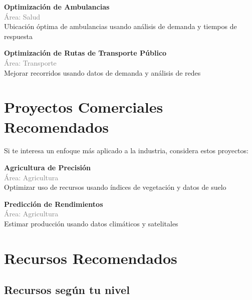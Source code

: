 \documentclass[11pt,a4paper]{article}
\begin{document}
\begin{tcolorbox}[colback=green!5,colframe=darkgreen,title={\small Proyecto Científico \#3}]
\textbf{Optimización de Ambulancias}\\[0.2cm]
\textcolor{gray}{\small Área: Salud}\\[0.2cm]
Ubicación óptima de ambulancias usando análisis de demanda y tiempos de respuesta
\end{tcolorbox}


\begin{tcolorbox}[colback=green!5,colframe=darkgreen,title={\small Proyecto Científico \#4}]
\textbf{Optimización de Rutas de Transporte Público}\\[0.2cm]
\textcolor{gray}{\small Área: Transporte}\\[0.2cm]
Mejorar recorridos usando datos de demanda y análisis de redes
\end{tcolorbox}


\section*{ Proyectos Comerciales Recomendados}

Si te interesa un enfoque más aplicado a la industria, considera estos proyectos:


\begin{tcolorbox}[colback=orange!5,colframe=darkorange,title={\small Proyecto Comercial \#1}]
\textbf{Agricultura de Precisión}\\[0.2cm]
\textcolor{gray}{\small Área: Agricultura}\\[0.2cm]
Optimizar uso de recursos usando índices de vegetación y datos de suelo
\end{tcolorbox}


\begin{tcolorbox}[colback=orange!5,colframe=darkorange,title={\small Proyecto Comercial \#2}]
\textbf{Predicción de Rendimientos}\\[0.2cm]
\textcolor{gray}{\small Área: Agricultura}\\[0.2cm]
Estimar producción usando datos climáticos y satelitales
\end{tcolorbox}


\section*{ Recursos Recomendados}

\subsection*{Recursos según tu nivel}
\end{document}
